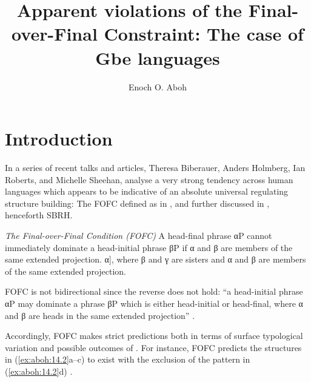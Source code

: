 \documentclass[output=paper]{langsci/langscibook}
\author{Enoch O. Aboh\affiliation{University of Amsterdam}}
\title{Apparent violations of the Final-over-Final Constraint: The case of Gbe
languages}
\begin{document}
\glsresetall

\section{Introduction}

In a series of recent talks and articles, Theresa Biberauer, Anders Holmberg,
Ian Roberts, and Michelle Sheehan, analyse a very strong tendency across human
languages which appears to be indicative of an absolute universal regulating
structure building: The \gls{FOFC} defined as in , and further
discussed in \textcite{SheeBibRobHol2017}, henceforth
SBRH.

\ea\label{ex:aboh:14.1} \emph{The Final-over-Final Condition (FOFC)}
    \ea A head-final phrase αP cannot immediately dominate a head-initial
    phrase βP if α and β are members of the same extended projection.
    \ex *[\textsubscript{α}\textsuperscript{P}
    [\textsubscript{β}\textsuperscript{P} β γ] α], where β and  γ are sisters
    and α and β are members of the same extended projection.
    \z
\z

FOFC is not bidirectional since the reverse does not hold: “a head-initial
phrase αP may dominate a phrase βP which is either head-initial or head-final,
where α and β are heads in the same extended projection”
\parencite[cf.][171]{BibHolRob2014}.

Accordingly, \gls{FOFC} makes strict predictions both in terms of surface typological
variation and possible outcomes of 
\parencite[cf.][]{BibNewShee2009}. For instance, \gls{FOFC} predicts the structures
in (\ref{ex:aboh:14.2}a--c) to exist with the exclusion of the pattern in (\ref{ex:aboh:14.2}d)
\parencite[cf.][171]{BibHolRob2014}.
\end{document}
